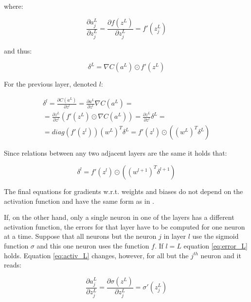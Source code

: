 \documentclass[journal, a4paper]{IEEEtran}
\begin{document}
    where:
    
    \begin{equation}
      \frac{\partial a_j^L}{\partial z_j^L} = \frac{\partial f(z^L)}{\partial z_j^L} = f'(z_j^L)
      \label{eq:activ_L}
    \end{equation}
    
    and thus:
    
    \begin{equation}
      \delta^L = \nabla C(a^L) \odot f'(z^L)
    \end{equation}
    
    For the previous layer, denoted $l$:
    
    \begin{equation}
    \begin{gathered}
      \delta^l = \frac{\partial C(a^L)}{\partial z^l} = \frac{\partial a^L}{\partial z^l} \nabla C(a^L) = \\ = \frac{\partial z^L}{\partial z^l} (f'(z^L) \odot \nabla C(a^L) ) = \frac{\partial z^L}{\partial z^l} \delta^L = \\ = diag(f'(z^l))(w^L)^T \delta^L = f'(z^l) \odot ((w^L)^T \delta^L)
    \end{gathered}
    \end{equation}
    
    Since relations between any two adjacent layers are the same it holds that:
    
    \begin{equation}
      \delta^l  = f'(z^l) \odot ((w^{l+1})^T \delta^{l+1})
    \end{equation}
    
    The final equations for gradients w.r.t. weights and biases do not depend on the activation function and have the same form as in \cite{MLDL}.
    
    If, on the other hand, only a single neuron in one of the layers has a different activation function, the errors for that layer have to be computed for one neuron at a time. Suppose that all neurons but the neuron $j$ in layer $l$ use the sigmoid function $\sigma$ and this one neuron uses the function $f$. If $l = L$ equation \ref{eq:error_L} holds. Equation \ref{eq:activ_L} changes, however, for all but the $j^{th}$ neuron and it reads:
    
    \begin{equation}
     \frac{\partial a_j^L}{\partial z_j^L} = \frac{\partial \sigma(z^L)}{\partial z_j^L} = \sigma'(z_j^L)
    \end{equation}
    
\end{document}
